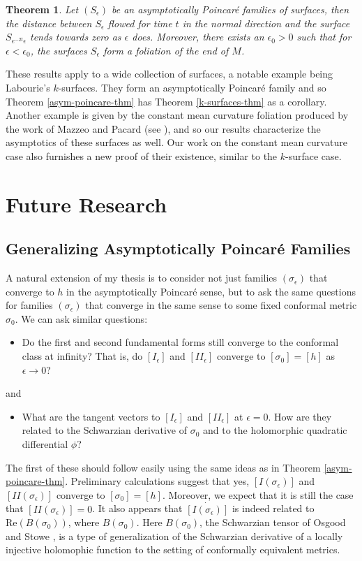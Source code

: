 \documentclass[11pt]{amsart}
\newcommand{\two}{I\!\!I}
\newtheorem{thm}{Theorem}[section]
\begin{document}
\begin{thm}
Let $(S_\epsilon)$ be an asymptotically Poincar\'e families of surfaces, then the distance between $S_\epsilon$ flowed for time $t$ in the normal direction and the surface $S_{e^{-2t}\epsilon}$ tends towards zero as $\epsilon$ does.
Moreover, there exists an $\epsilon_0 > 0$ such that for $\epsilon < \epsilon_0$, the surfaces $S_\epsilon$ form a foliation of the end of $M$.
\end{thm}

These results apply to a wide collection of surfaces, a notable example being Labourie's $k$-surfaces. 
They form an asymptotically Poincar\'e family and so Theorem \ref{asym-poincare-thm} has Theorem \ref{k-surfaces-thm} as a corollary. 
Another example is given by the constant mean curvature foliation produced by the work of Mazzeo and Pacard (see \cite{mazzeo-pacard2011}), and so our results characterize the asymptotics of these surfaces as well. 
Our work on the constant mean curvature case also furnishes a new proof of their existence, similar to the $k$-surface case.


\section{Future Research} \label{research plan}


\subsection{Generalizing Asymptotically Poincar\'e Families} \label{generalize families}
A natural extension of my thesis is to consider not just families $(\sigma_\epsilon)$ that converge to $h$ in the asymptotically Poincar\'e sense, but to ask the same questions for families $(\sigma_\epsilon)$ that converge in the same sense to some fixed conformal metric $\sigma_0$. 
We can ask similar questions:
\begin{itemize}
\item Do the first and second fundamental forms still converge to the conformal class at infinity? 
That is, do $[I_\epsilon]$ and $[I\!I_\epsilon]$ converge to $[\sigma_0] = [h]$ as $\epsilon \to 0$?
\end{itemize}
and 
\begin{itemize}
\item What are the tangent vectors to $[I_\epsilon]$ and $[I\!I_\epsilon]$ at $\epsilon =0$. 
How are they related to the Schwarzian derivative of $\sigma_0$ and to the holomorphic quadratic differential $\phi$? 
\end{itemize}
The first of these should follow easily using the same ideas as in Theorem \ref{asym-poincare-thm}. 
Preliminary calculations suggest that yes, $[I(\sigma_\epsilon)]$ and $[\two(\sigma_\epsilon)]$ converge to $[\sigma_0] = [h]$.
Moreover, we expect that it is still the case that $\dot{[\two(\sigma_\epsilon)]} = 0$.
It also appears that $\dot{[I(\sigma_\epsilon)]}$ is indeed related to $\mathrm{Re}(B(\sigma_0))$, where $B(\sigma_0)$.
Here $B(\sigma_0)$, the Schwarzian tensor of Osgood and Stowe \cite{osgood-stowe1992}, is a type of generalization of the Schwarzian derivative of a locally injective holomophic function to the setting of conformally equivalent metrics. 
\end{document}
